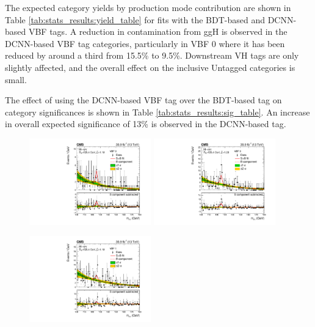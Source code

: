 The expected category yields by production mode contribution are shown in Table \ref{tab:stats_results:yield_table} for fits with the BDT-based and DCNN-based VBF tags. 
A reduction in contamination from ggH is observed in the DCNN-based VBF tag categories, particularly in VBF 0 where it has been reduced by around a third from 15.5\% to 9.5\%. 
Downstream VH tags are only slightly affected, and the overall effect on the inclusive Untagged categories is small. 

The effect of using the DCNN-based VBF tag over the BDT-based tag on category significances is shown in Table \ref{tab:stats_results:sig_table}.
An increase in overall expected significance of 13\% is observed in the DCNN-based tag. 
\newpage
\begin{figure}[h!]
    \begin{center}
        \includegraphics[width=0.47\textwidth]{figures/stats_results/CMS-HIG-16-040_Figure_012-a.pdf}
        \includegraphics[width=0.47\textwidth]{figures/stats_results/SBplots_jackWSnewVBFTag_0_13TeV.pdf}
    \end{center}
    \begin{center}
        \includegraphics[width=0.47\textwidth]{figures/stats_results/CMS-HIG-16-040_Figure_012-b.pdf}

\end{center}
\end{figure}
